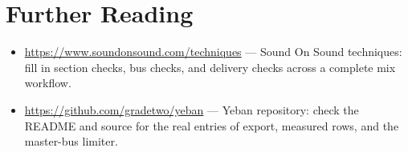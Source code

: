 \section*{Further Reading}
\begin{itemize}[leftmargin=1.5em]
\item \url{https://www.soundonsound.com/techniques} — Sound On Sound techniques: fill in section checks, bus checks, and delivery checks across a complete mix workflow.
\item \url{https://github.com/gradetwo/yeban} — Yeban repository: check the README and source for the real entries of export, measured rows, and the master-bus limiter.
\end{itemize}
